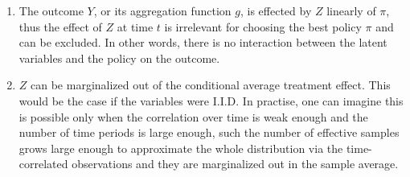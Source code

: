 \documentclass[a4paper,12pt]{article}
\begin{document}
\begin{enumerate}

\item The outcome $Y$, or its aggregation function $g$, is effected by $Z$ linearly of $\pi$, thus the effect of $Z$ at time $t$ is irrelevant for choosing the best policy $\pi$ and can be excluded. In other words, there is no interaction between the latent variables and the policy on the outcome.

\item $Z$ can be marginalized out of the conditional average treatment effect. This would be the case if the variables were I.I.D. In practise, one can imagine this is possible only when the correlation over time is weak enough and the number of time periods is large enough, such the number of effective samples grows large enough to approximate the whole distribution via the time-correlated observations and they are marginalized out in the sample average.

\end{enumerate}



\printbibliography
\end{document}
